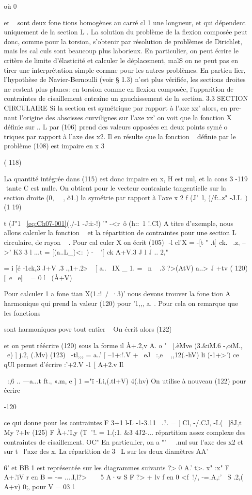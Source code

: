 où 0{ et ~ sont deux fone tions homogènes au carré cl 1 une longueur, et qui 
dépendent uniquement de la section L . 
La solution du problème de la flexion composée peut donc, comme pour la torsion, s'obtenir par résolution de problèmes de Dirichlet, mais les cal­
culs sont beaucoup plus laborieux. En particulier, on peut écrire le critère de limite d'élasticité et calculer le déplacement, malS on ne peut pas en 
tirer une interprétation simple cormne pour les autres problèmes. En particu­
lier, l'hypothèse de Navier-Bernoulli (voir § 1.3) n'est plus vérifiée, les 
sections droites ne restent plus planes: en torsion comme en flexion composée, l'apparition de contraintes de cisaillement entraîne un gauchissement de la section. 
3.3 SECTION CIRCULAIRE 
Si la section est symétrique par rapport à l'axe xz' alors, en pre­nant l'origine des abscisses curvilignes sur l'axe xz' on voit que la fonction X définie sur .. L par (106) prend des valeurs opposées en deux points symé­
o 
triques par rapport à l'axe des x2. Il en résulte que la fonction ~ définie par le problème (108) est impaire en x
3 

( 118) 


La quantité intégrée dans (115) est donc impaire en x, H est nul, et la cons­
3 
-119 ­
tante C est nulle. On obtient pour le vecteur contrainte tangentielle sur la section droite (0, ~~, ô1.) la symétrie par rapport à l'axe x
2 f (J"~l, (/f:..z" -J.L~)
(1 19) 


t (J"1~ \eqref{eq:Ch07-001}(./-1 -J:i:-!) '" -<r~ô (h::~1 !.Cl) 
A titre d'exemple, nous allons calculer la fonction ~ et la répar­tition de contraintes pour une section L circulaire, de rayon ~ . Pour cal­
culer X on écrit (105)
 
-l
cl'X = -[t " .t] ck. 
~.z, --\+>' K3 3
l 
...t 
= [(a..L_)<:~) -~~"] ck
A+V.3 J
l 
J .. 2," 

= i [é -1ck,3
J+V .3 .,1+.2»
~ [ a..~ IX _
1. = ~n
~ .3 ?>(AtV) 
a..> J +tv
( 120) [~e ~e]
~ = 
0 l ~(À+V) 

Pour calculer 1 a fone tian X(1.:!~/~·3)' nous devons trouver la fone tion A 
harmonique qui prend la valeur (120) pour '1,,, a. . Pour cela on remarque que
 
les fonctions 


sont harmoniques povr tout entier ~ On écrit alors 
(122) 

et on peut réécrire (120) sous la forme 
il À+.2,v
A. o " ~[.èMve (3.&iM.6 -,oiM., ~e) ] j.2, (.Mv)
(123) 
~-tl,,, 
= a..' [ --1+:!.V + ~eJ
~:,e ~ ,,12(.-hV) li (-1+>') 
ce qUl permet d'écrire 
:'+2.V
-1 [ A+2.v Il} ~:,6 .. ---a...t ft., ».m, e ] 1 ="ï -I.i,(.tl+V) 4(.hv) 
On utilise à nouveau (122) pour écrire 

-120 ­

ce qui donne pour les contraintes 
F 3+1\1 l-L -1-3.11 
~.?. = [ Cl, -/.CJ, -I.(~ ]8J,t My ?+lv
(125) 
F À+.'I,y 
(T~'!. = 1.(:1. &3 
4J2-...\+\1 
répartition assez complexe des contraintes de cisaillement. 
OC" 
En particulier, on a 
"" 
~~.nul sur l'axe des x2 et sur t 
\ 
l'axe des x, La répartition de
3 
~L sur les deux diamètres AA' 


6' 
et BB 1 est représentée sur les diagrammes suivants 
?>
0
A.' t>. x"­
:x" 
F A+.'iV r
en B = -= ....I,l?> ­
~~ 
5 A·w S F ?> + lv f
en 0 <f~!/, -=.A,:'~ S .2,( A+v) 0;, 
pour V = 03
1 

